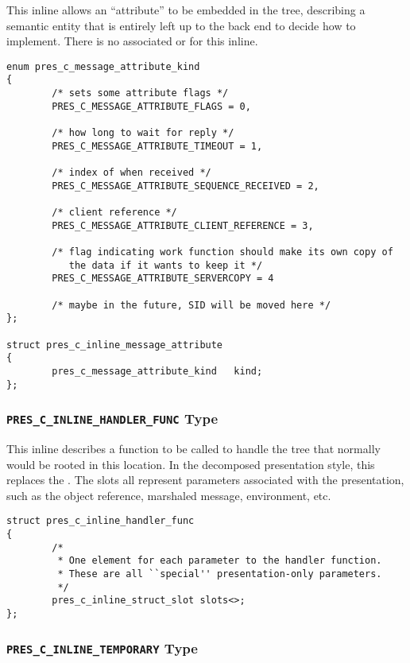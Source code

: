 This inline allows an ``attribute'' to be embedded in the tree, describing a
semantic entity that is entirely left up to the back end to decide how to
implement.  There is no associated \CAST{} or \MINT{} for this inline.

\begin{verbatim}
enum pres_c_message_attribute_kind
{
        /* sets some attribute flags */
        PRES_C_MESSAGE_ATTRIBUTE_FLAGS = 0,

        /* how long to wait for reply */
        PRES_C_MESSAGE_ATTRIBUTE_TIMEOUT = 1,

        /* index of when received */
        PRES_C_MESSAGE_ATTRIBUTE_SEQUENCE_RECEIVED = 2,

        /* client reference */
        PRES_C_MESSAGE_ATTRIBUTE_CLIENT_REFERENCE = 3,

        /* flag indicating work function should make its own copy of
           the data if it wants to keep it */
        PRES_C_MESSAGE_ATTRIBUTE_SERVERCOPY = 4

        /* maybe in the future, SID will be moved here */
};

struct pres_c_inline_message_attribute
{
        pres_c_message_attribute_kind   kind;
};
\end{verbatim}

\subsubsection{\texttt{PRES\_C\_INLINE\_HANDLER\_FUNC} Type}

This inline describes a function to be called to handle the \PRESC{} tree that
normally would be rooted in this location.  In the decomposed presentation
style, this replaces the .  The
slots all represent parameters associated with the presentation, such as the
object reference, marshaled message, environment, etc.

\begin{verbatim}
struct pres_c_inline_handler_func
{
        /*
         * One element for each parameter to the handler function.
         * These are all ``special'' presentation-only parameters.
         */
        pres_c_inline_struct_slot slots<>;
};
\end{verbatim}

\subsubsection{\texttt{PRES\_C\_INLINE\_TEMPORARY} Type}


